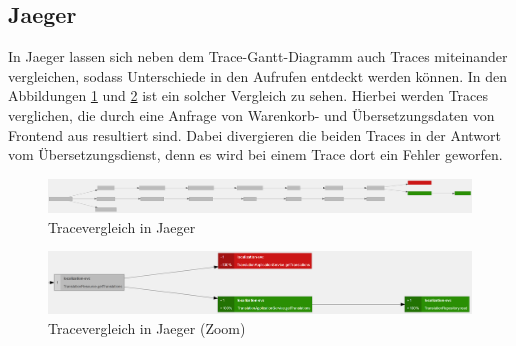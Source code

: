 \subsection{Jaeger}
\label{sec:demo-jaeger}

In Jaeger lassen sich neben dem Trace-Gantt-Diagramm auch Traces miteinander vergleichen, sodass Unterschiede in den Aufrufen entdeckt werden können. In den Abbildungen \ref*{fig:keine-uebersetzungen_jaeger_error-comparison-all} und \ref*{fig:keine-uebersetzungen_jaeger_error-comparison-zoom} ist ein solcher Vergleich zu sehen. Hierbei werden Traces verglichen, die durch eine Anfrage von Warenkorb- und Übersetzungsdaten von Frontend aus resultiert sind. Dabei divergieren die beiden Traces in der Antwort vom Übersetzungsdienst, denn es wird bei einem Trace dort ein Fehler geworfen.

\begin{figure}[H]
	\centering
	\includegraphics[width=1.00\linewidth]{img/99_postscript/keine-uebersetzungen_jaeger_error-comparison-all.png}
	\caption{Tracevergleich in Jaeger}
	\label{fig:keine-uebersetzungen_jaeger_error-comparison-all}
\end{figure}

\begin{figure}[H]
	\centering
	\includegraphics[width=1.00\linewidth]{img/99_postscript/keine-uebersetzungen_jaeger_error-comparison-zoom.png}
	\caption{Tracevergleich in Jaeger (Zoom)}
	\label{fig:keine-uebersetzungen_jaeger_error-comparison-zoom}
\end{figure}